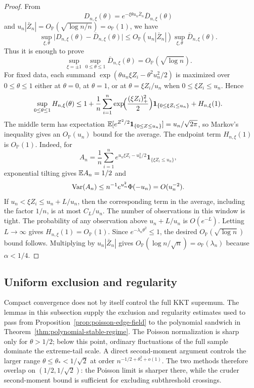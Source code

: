 \begin{proof}
From
\[
    D_{n,\xi}(\theta)
    =
    e^{-\xi\theta u_n\bar Z_n}\overline D_{n,\xi}(\theta)
\]
and $u_n|\bar Z_n|=O_{\mathbb P}(\sqrt{\log n/n})=o_{\mathbb P}(1)$, we have
\[
    \sup_{\xi,\theta}
    \bigl|D_{n,\xi}(\theta)-\overline D_{n,\xi}(\theta)\bigr|
    \le
    O_{\mathbb P}(u_n|\bar Z_n|)
    \sup_{\xi,\theta}\overline D_{n,\xi}(\theta).
\]
Thus it is enough to prove
\[
    \sup_{\xi=\pm1}\sup_{0\le\theta\le1}\overline D_{n,\xi}(\theta)
    =
    O_{\mathbb P}(\sqrt{\log n}).
\]
For fixed data, each summand $\exp(\theta u_n\xi Z_i-\theta^2u_n^2/2)$ is maximized over $0\le\theta\le1$ either at $\theta=0$, at $\theta=1$, or at $\theta=\xi Z_i/u_n$ when $0\le\xi Z_i\le u_n$. Hence
\[
    \sup_{0\le\theta\le1}H_{n,\xi}(\theta)
    \le
    1+
    \frac1n\sum_{i=1}^n
    \exp\!\Bigl(\frac{(\xi Z_i)_+^2}{2}\Bigr)
    \mathbf 1_{\{0\le \xi Z_i\le u_n\}}
    +
    H_{n,\xi}(1).
\]
The middle term has expectation $\mathbb{E}[e^{Z^2/2}\mathbf 1_{\{0\le Z\le u_n\}}]=u_n/\sqrt{2\pi}$, so Markov's inequality gives an \(O_{\mathbb P}(u_n)\) bound for the average. The endpoint term $H_{n,\xi}(1)$ is $O_{\mathbb P}(1)$. Indeed, for
\[
    A_n=
    \frac1n\sum_{i=1}^n
    e^{u_n\xi Z_i-u_n^2/2}
    \mathbf 1_{\{\xi Z_i\le u_n\}},
\]
exponential tilting gives $\mathbb{E} A_n=1/2$ and
\[
    \operatorname{Var}(A_n)
    \le
    n^{-1}e^{u_n^2}\Phi(-u_n)
    =
    O(u_n^{-2}).
\]
If \(u_n<\xi Z_i\le u_n+L/u_n\), then the corresponding term in the average, including the factor \(1/n\), is at most \(C_L/u_n\). The number of observations in this window is tight. The probability of any observation above \(u_n+L/u_n\) is \(O(e^{-L})\). Letting \(L\to\infty\) gives \(H_{n,\xi}(1)=O_{\mathbb P}(1)\). Since $e^{-\lambda_n\theta^2}\le1$, the desired $O_{\mathbb P}(\sqrt{\log n})$ bound follows. Multiplying by $u_n|\bar Z_n|$ gives $O_{\mathbb P}(\log n/\sqrt n)=o_{\mathbb P}(\lambda_n)$ because $\alpha<1/4$.
\end{proof}

\subsection{Uniform exclusion and regularity}

Compact convergence does not by itself control the full KKT supremum. The
lemmas in this subsection supply the exclusion and regularity estimates used
to pass from Proposition~\ref{prop:poisson-edge-field} to the polynomial
sandwich in Theorem~\ref{thm:polynomial-stable-regime}. The Poisson
normalization is sharp only for \(\theta>1/2\); below this point,
ordinary fluctuations of the full sample dominate the extreme-tail scale. A
direct second-moment argument controls the larger range
\(\theta\le\theta_*<1/\sqrt2\) at order
\(n^{-1/2+\theta_*^2+o(1)}\). The two methods therefore overlap on
\((1/2,1/\sqrt2)\): the Poisson limit is sharper there, while the cruder
second-moment bound is sufficient for excluding subthreshold crossings.

